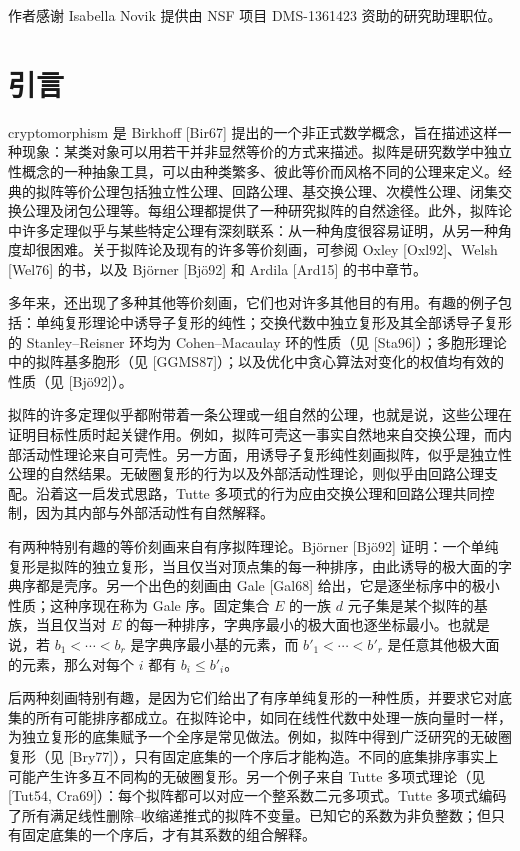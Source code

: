 作者感谢 Isabella Novik 提供由 NSF 项目 DMS-1361423 资助的研究助理职位。

\section{引言}
cryptomorphism 是 Birkhoff [Bir67] 提出的一个非正式数学概念，旨在描述这样一种现象：某类对象可以用若干并非显然等价的方式来描述。拟阵是研究数学中独立性概念的一种抽象工具，可以由种类繁多、彼此等价而风格不同的公理来定义。经典的拟阵等价公理包括独立性公理、回路公理、基交换公理、次模性公理、闭集交换公理及闭包公理等。每组公理都提供了一种研究拟阵的自然途径。此外，拟阵论中许多定理似乎与某些特定公理有深刻联系：从一种角度很容易证明，从另一种角度却很困难。关于拟阵论及现有的许多等价刻画，可参阅 Oxley [Oxl92]、Welsh [Wel76] 的书，以及 Björner [Bjö92] 和 Ardila [Ard15] 的书中章节。

多年来，还出现了多种其他等价刻画，它们也对许多其他目的有用。有趣的例子包括：单纯复形理论中诱导子复形的纯性；交换代数中独立复形及其全部诱导子复形的 Stanley--Reisner 环均为 Cohen--Macaulay 环的性质（见 [Sta96]）；多胞形理论中的拟阵基多胞形（见 [GGMS87]）；以及优化中贪心算法对变化的权值均有效的性质（见 [Bjö92]）。

拟阵的许多定理似乎都附带着一条公理或一组自然的公理，也就是说，这些公理在证明目标性质时起关键作用。例如，拟阵可壳这一事实自然地来自交换公理，而内部活动性理论来自可壳性。另一方面，用诱导子复形纯性刻画拟阵，似乎是独立性公理的自然结果。无破圈复形的行为以及外部活动性理论，则似乎由回路公理支配。沿着这一启发式思路，Tutte 多项式的行为应由交换公理和回路公理共同控制，因为其内部与外部活动性有自然解释。

有两种特别有趣的等价刻画来自有序拟阵理论。Björner [Bjö92] 证明：一个单纯复形是拟阵的独立复形，当且仅当对顶点集的每一种排序，由此诱导的极大面的字典序都是壳序。另一个出色的刻画由 Gale [Gal68] 给出，它是逐坐标序中的极小性质；这种序现在称为 Gale 序。固定集合 $E$ 的一族 $d$ 元子集是某个拟阵的基族，当且仅当对 $E$ 的每一种排序，字典序最小的极大面也逐坐标最小。也就是说，若 $b_1<\cdots<b_r$ 是字典序最小基的元素，而 $b'_1<\cdots<b'_r$ 是任意其他极大面的元素，那么对每个 $i$ 都有 $b_i\le b'_i$。

后两种刻画特别有趣，是因为它们给出了有序单纯复形的一种性质，并要求它对底集的所有可能排序都成立。在拟阵论中，如同在线性代数中处理一族向量时一样，为独立复形的底集赋予一个全序是常见做法。例如，拟阵中得到广泛研究的无破圈复形（见 [Bry77]），只有固定底集的一个序后才能构造。不同的底集排序事实上可能产生许多互不同构的无破圈复形。另一个例子来自 Tutte 多项式理论（见 [Tut54, Cra69]）：每个拟阵都可以对应一个整系数二元多项式。Tutte 多项式编码了所有满足线性删除--收缩递推式的拟阵不变量。已知它的系数为非负整数；但只有固定底集的一个序后，才有其系数的组合解释。

